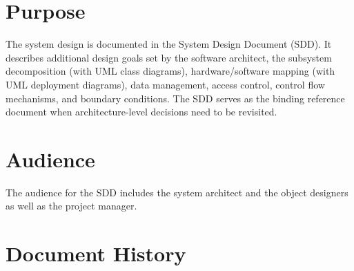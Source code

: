 \documentclass[a4paper,12pt]{scrartcl}
\begin{document}
\section*{Purpose}
The system design is documented in the System Design Document (SDD). It describes additional design goals set by the software architect, the subsystem decomposition (with UML class diagrams), hardware/software mapping (with UML deployment diagrams), data management, access control, control flow mechanisms, and boundary conditions. The SDD serves as the binding reference document when architecture-level decisions need to be revisited.

\section*{Audience}
The audience for the SDD includes the system architect and the object designers as well as the project manager.
\nopagebreak

\renewcommand{\contentsname}{Table of Contents}
\tableofcontents
\section*{Document History}
\end{document}
